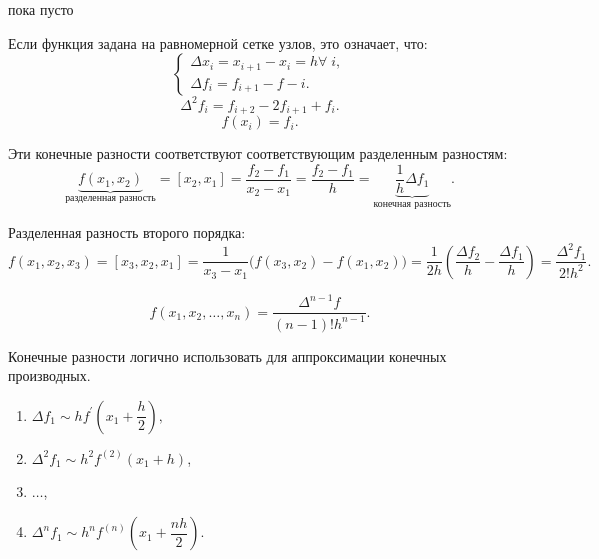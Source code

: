 \begin{col-answer-preambule}
	\begin{plan}
    \item пока пусто
	\end{plan}
\end{col-answer-preambule}


Если функция задана на равномерной сетке узлов, это означает, что:
\begin{equation*}
  \begin{cases}
    \Delta x_i = x_{i + 1} - x_i = h \forall \; i, \\
    \Delta f_i = f_{i+1} - f-i.
  \end{cases}
\end{equation*}
\begin{equation*}
  \Delta^2 f_i = f_{i+2} - 2 f_{i+1} + f_i.
\end{equation*}
\begin{equation*}
  f(x_i) = f_i.
\end{equation*}

Эти конечные разности соответствуют соответствующим разделенным разностям:
\begin{equation*}
  \underbrace{f(x_1, x_2)}_{\text{разделенная разность}} = [x_2, x_1] = \dfrac{f_2 - f_1}{x_2 - x_1} = \dfrac{f_2 - f_1}{h} = \underbrace{\dfrac{1}{h} \Delta f_1}_{\text{конечная разность}}.
\end{equation*}

Разделенная разность второго порядка:
\begin{equation*}
  f(x_1, x_2, x_3) = [x_3, x_2, x_1] = \dfrac{1}{x_3 - x_1} \Big( f(x_3, x_2) - f(x_1, x_2) \Big) = \dfrac{1}{2h} \left(\dfrac{\Delta f_2}{h} - \dfrac{\Delta f_1}{h} \right) = \dfrac{\Delta^2 f_1}{2! h^2}.
\end{equation*}

\begin{equation*}
  f(x_1, x_2, \ldots, x_n) = \dfrac{\Delta^{n-1} f}{(n-1)! h^{n-1}}.
\end{equation*}

Конечные разности логично использовать для аппроксимации конечных производных.

\begin{enumerate}
  \item $\Delta f_1 \sim h f^{'} \left(x_1 + \dfrac{h}{2} \right),$
  \item $\Delta^2 f_1 \sim h^2 f^{(2)} (x_1 + h)$,
  \item $\ldots$,
  \item $\Delta^n f_1 \sim h^n f^{(n)} (x_1 + \dfrac{n h}{2}).$
\end{enumerate}

